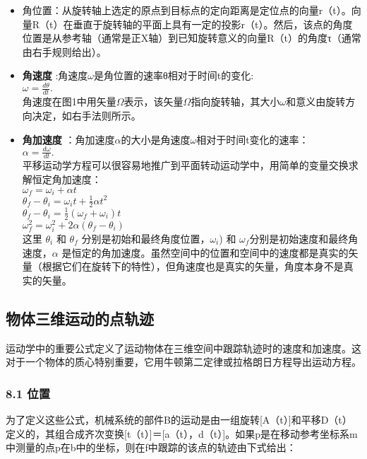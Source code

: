 \begin{itemize}
\item 角位置：从旋转轴上选定的原点到目标点的定向距离是定位点的向量r（t）。向量R（t）在垂直于旋转轴的平面上具有一定的投影r（t）。然后，该点的角度位置是从参考轴（通常是正X轴）到已知旋转意义的向量R（t）的角度τ（通常由右手规则给出）。
\item \textbf{角速度} :角速度$\omega$是角位置的速率θ相对于时间t的变化:\\
$\omega = \frac{d\theta}{dt}.$\\
角速度在图1中用矢量$\Omega$表示，该矢量$\Omega$指向旋转轴，其大小$\omega$和意义由旋转方向决定，如右手法则所示。
\item \textbf{角加速度} ：角加速度$\alpha$的大小是角速度$\omega$相对于时间t变化的速率：\\
$\alpha = \frac{d\omega}{dt}.$\\
平移运动学方程可以很容易地推广到平面转动运动学中，用简单的变量交换求解恒定角加速度：\\
$\omega_f = \omega_i + \alpha t$\\
$\theta_f - \theta_i = \omega_i t + \frac{1}{2} \alpha t^2$\\
$\theta_f - \theta_i = \frac{1}{2} (\omega_f + \omega_i) t$\\
$\omega_f^2 = \omega_i^2 + 2 \alpha (\theta_f - \theta_i)$\\

这里 $\theta_i$ 和 $\theta_f$ 分别是初始和最终角度位置，$\omega_i$) 和 $\omega_f$分别是初始速度和最终角速度，$\alpha$ 是恒定的角加速度。虽然空间中的位置和空间中的速度都是真实的矢量（根据它们在旋转下的特性），但角速度也是真实的矢量，角度本身不是真实的矢量。

\end{itemize}

\subsection{物体三维运动的点轨迹}

运动学中的重要公式定义了运动物体在三维空间中跟踪轨迹时的速度和加速度。这对于一个物体的质心特别重要，它用牛顿第二定律或拉格朗日方程导出运动方程。

\subsubsection{8.1 位置}

为了定义这些公式，机械系统的部件B的运动是由一组旋转[A（t）]和平移D（t）定义的，其组合成齐次变换[t（t）]＝[a（t），d（t）]。如果p是在移动参考坐标系m中测量的点p在b中的坐标，则在f中跟踪的该点的轨迹由下式给出：

